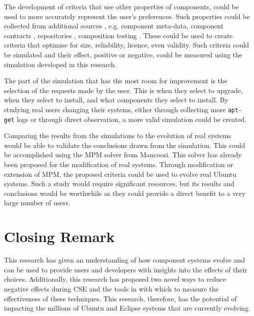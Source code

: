 The development of criteria that use other properties of components, 
could be used to more accurately represent the user's preferences.
Such properties could be collected from additional sources
, e.g. component meta-data, component contracts \citep{Watkins1999}, repositories \citep{Guo2000}, 
composition testing \citep{XuejieZhang2008}.
These could be used to create criteria that optimise for size, reliability, licence, even validity.
Such criteria could be simulated and their effect, positive or negative, 
could be measured using the simulation developed in this research.

The part of the simulation that has the most room for improvement is the selection of the requests made by the user.
This is when they select to upgrade, when they select to install, and what components they select to install.
By studying real users changing their systems, either through collecting more \texttt{apt-get} logs or through direct observation,
a more valid simulation could be created.

Comparing the results from the simulations to the evolution of real systems would be able to validate the conclusions drawn from the simulation.
This could be accomplished using the MPM solver \citep{abate2011} from Mancoosi.
This solver has already been proposed for the modification of real systems.
Through modification or extension of MPM, the proposed criteria could be used to evolve real Ubuntu systems.
Such a study would require significant resources, but its results and conclusions would be worthwhile as they could provide a direct benefit to a very large number of users.

\section{Closing Remark}
This research has given an understanding of how component systems evolve and can be used to provide users and developers with insights into the effects of their choices.
Additionally, this research has proposed two novel ways to reduce negative effects during CSE and the tools in with which to measure the effectiveness of these techniques.
This research, therefore, has the potential of impacting the millions of Ubuntu and Eclipse systems that are currently evolving.


